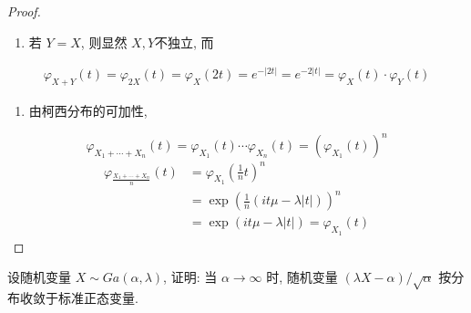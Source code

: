 \documentclass[../main.tex]{subfiles}
\begin{document}
\begin{proof}
\begin{enumerate}
    \item 若 $Y= X$, 则显然 $X,Y$不独立, 而 
\end{enumerate}
      $$ \begin{aligned}  \varphi _{X+ Y}\left(t\right)=  \varphi _{2X}\left(t\right)=  \varphi _{X}\left(2t\right)= e^{-\left| 2t \right| }= e^{-2\left| t \right| }=  \varphi _{X}\left(t\right)\cdot  \varphi _{Y}\left(t\right) \end{aligned} $$ 
\begin{enumerate}
    \item 由柯西分布的可加性,  
\end{enumerate}
$$  \varphi _{X_1+ \cdots + X_{n}}\left(t\right)=  \varphi _{X_1}\left(t\right)\cdots  \varphi _{X_{n}}\left(t\right)= \left( \varphi _{X_1}\left(t\right)\right)^{n} $$  
$$ \begin{aligned}  \varphi _{\frac{X_1+ \cdots + X_{n} }{n }}\left(t\right)&=  \varphi _{X_1}\left(\frac{1 }{n }t\right)^{n}\\&= \exp \left(\frac{1 }{n }\left(it\mu - \lambda \left| t \right|\right) \right)^{n}\\&= \exp \left(it\mu - \lambda \left| t \right| \right)=  \varphi _{X_1}\left(t\right)  \end{aligned}$$  
\end{proof}
\begin{exercise}{}{}
设随机变量 $X \sim Ga(\alpha, \lambda)$, 证明: 当 $\alpha \to \infty$ 时, 随机变量 $(\lambda X - \alpha) / \sqrt{\alpha}$ 按分布收敛于标准正态变量.
\end{exercise}
\end{document}
